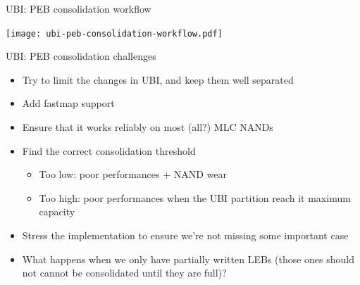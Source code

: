 \documentclass[obeyspaces,spaces,hyphens,dvipsnames]{beamer}
\begin{document}
\begin{frame}{UBI: PEB consolidation workflow}
  \begin{center}
    \texttt{[image: ubi-peb-consolidation-workflow.pdf]}
  \end{center}
\end{frame}

\begin{frame}{UBI: PEB consolidation challenges}
  \begin{itemize}
  \item Try to limit the changes in UBI, and keep them well separated
  \item Add fastmap support
  \item Ensure that it works reliably on most (all?) MLC NANDs
  \item Find the correct consolidation threshold
    \begin{itemize}
    \item Too low: poor performances + NAND wear
    \item Too high: poor performances when the UBI partition reach it
          maximum capacity
    \end{itemize}
  \item Stress the implementation to ensure we're not missing some
        important case
  \item What happens when we only have partially written LEBs (those
        ones should not cannot be consolidated until they are full)?
  \end{itemize}
\end{frame}
\end{document}
